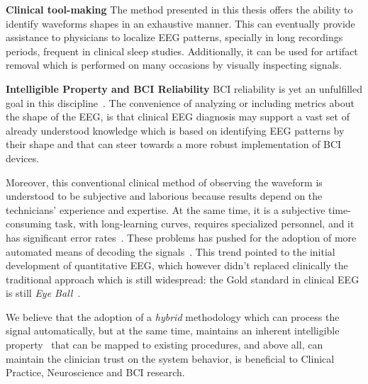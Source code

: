 \textbf{Clinical tool-making}
The method presented in this thesis offers the ability to identify waveforms shapes in an exhaustive manner.  This can eventually provide assistance to physicians to localize EEG patterns, specially in long recordings periods, frequent in clinical sleep studies.  Additionally, it can be used for artifact removal which is performed on many occasions by visually inspecting signals. %


\textbf{Intelligible Property and BCI Reliability}
BCI reliability is yet an unfulfilled goal in this discipline~\cite{WolpawJonathanR2012}. The convenience of analyzing or including metrics about the shape of the EEG, is that clinical EEG diagnosis may support a vast set of already understood knowledge which is based on identifying EEG patterns by their shape and that can steer towards a more robust implementation of BCI devices.  


Moreover, this conventional clinical method of observing the waveform is understood to be subjective and laborious because results depend on the technicians' experience and expertise.   At the same time, it is a subjective time-consuming task, with long-learning curves, requires specialized personnel, and it has significant error rates~\cite{Tjepkema-Cloostermans2018}.  These problems has pushed for the adoption of more automated means of decoding the signals~\cite{Thakor2004}.   This trend pointed to the initial development of quantitative EEG, which however didn't replaced clinically the traditional approach which is still widespread: the Gold standard in clinical EEG is still \textit{Eye Ball}~\cite{Wulsin2011,Tjepkema-Cloostermans2018}.  

We believe that the adoption of a \textit{hybrid} methodology which can process the signal automatically, but at the same time, maintains an inherent intelligible property~\cite{j2018challenge} that can be mapped to existing procedures, and above all, can maintain the clinician trust on the system behavior, is beneficial to Clinical Practice, Neuroscience and BCI research. 


